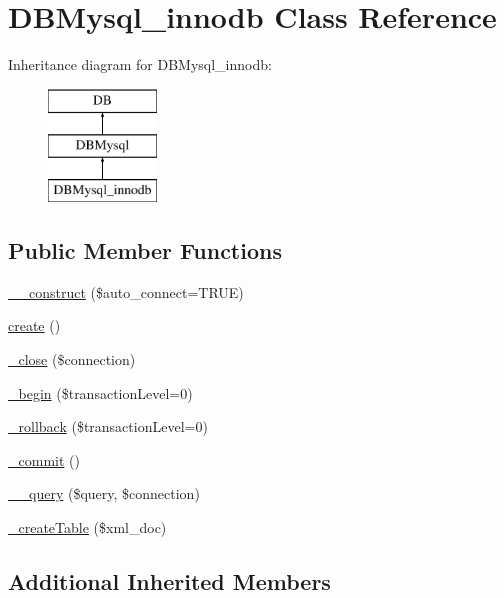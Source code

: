 \hypertarget{classDBMysql__innodb}{\section{D\-B\-Mysql\-\_\-innodb Class Reference}
\label{classDBMysql__innodb}
}
Inheritance diagram for D\-B\-Mysql\-\_\-innodb\-:\begin{figure}[H]
\begin{center}
\leavevmode
\includegraphics[height=3.000000cm]{classDBMysql__innodb}
\end{center}
\end{figure}
\subsection*{Public Member Functions}
\begin{DoxyCompactItemize}
\item 
\hyperlink{classDBMysql__innodb_a8ea6f226efb21784ff245e12109b784b}{\-\_\-\-\_\-construct} (\$auto\-\_\-connect=T\-R\-U\-E)
\item 
\hyperlink{classDBMysql__innodb_ac00d0e52855fb50fc453dd78367de102}{create} ()
\item 
\hyperlink{classDBMysql__innodb_a006f982aef8b7fd2909d3912e0afb032}{\-\_\-close} (\$connection)
\item 
\hyperlink{classDBMysql__innodb_a12c61046869744bc9df72753d6ca8348}{\-\_\-begin} (\$transaction\-Level=0)
\item 
\hyperlink{classDBMysql__innodb_a36779df768253f967560eee5a8c1ae89}{\-\_\-rollback} (\$transaction\-Level=0)
\item 
\hyperlink{classDBMysql__innodb_a9ffbd5a0d262ae7dd7fb840822a7e543}{\-\_\-commit} ()
\item 
\hyperlink{classDBMysql__innodb_a12af9ec87d5f630d282c2bc2571ee5fe}{\-\_\-\-\_\-query} (\$query, \$connection)
\item 
\hyperlink{classDBMysql__innodb_aa2b634992fbfaaadea5c897b8810b87c}{\-\_\-create\-Table} (\$xml\-\_\-doc)
\end{DoxyCompactItemize}
\subsection*{Additional Inherited Members}


